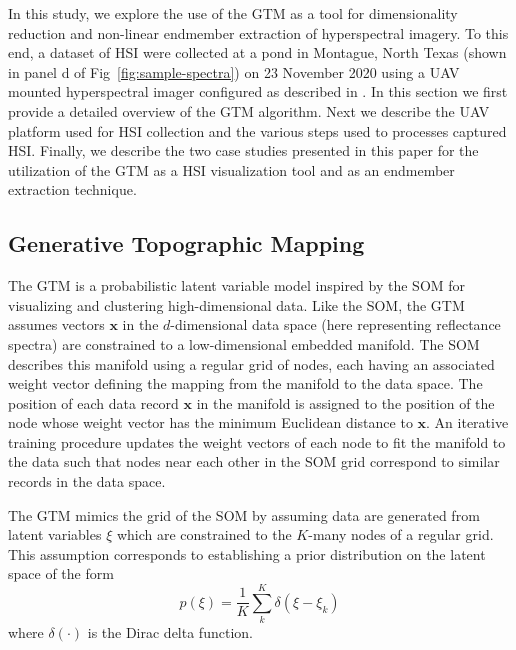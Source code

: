 \documentclass[remotesensing,article,submit,pdftex,moreauthors]{Definitions/mdpi}
\begin{document}
In this study, we explore the use of the GTM as a tool for dimensionality reduction and non-linear endmember extraction of hyperspectral imagery. To this end, a dataset of HSI were collected at a pond in Montague, North Texas (shown in panel d of Fig~\ref{fig:sample-spectra}) on 23 November 2020 using a UAV mounted hyperspectral imager configured as described in \cite{robot-team-1, robot-team-2}. In this section we first provide a detailed overview of the GTM algorithm. Next we describe the UAV platform used for HSI collection and the various steps used to processes captured HSI. Finally, we describe the two case studies presented in this paper for the utilization of the GTM as a HSI visualization tool and as an endmember extraction technique.

\subsection{Generative Topographic Mapping}\label{sec:gtm-overview}


The GTM is a probabilistic latent variable model inspired by the SOM for visualizing and clustering high-dimensional data. Like the SOM, the GTM assumes vectors $\mathbf{x}$ in the $d$-dimensional data space (here representing reflectance spectra) are constrained to a low-dimensional embedded manifold. The SOM describes this manifold using a regular grid of nodes, each having an associated weight vector defining the mapping from the manifold to the data space. The position of each data record $\mathbf{x}$ in the manifold is assigned to the position of the node whose weight vector has the minimum Euclidean distance to $\mathbf{x}$. An iterative training procedure updates the weight vectors of each node to fit the manifold to the data such that nodes near each other in the SOM grid correspond to similar records in the data space.

The GTM mimics the grid of the SOM by assuming data are generated from latent variables $\xi$ which are constrained to the $K$-many nodes of a regular grid. This assumption corresponds to establishing a prior distribution on the latent space of the form
\begin{equation}\label{eq:latent-prob}
    p(\xi) = \frac{1}{K}\sum_k^K \delta(\xi - \xi_k)
\end{equation}
where $\delta(\cdot)$ is the Dirac delta function.
\end{document}
